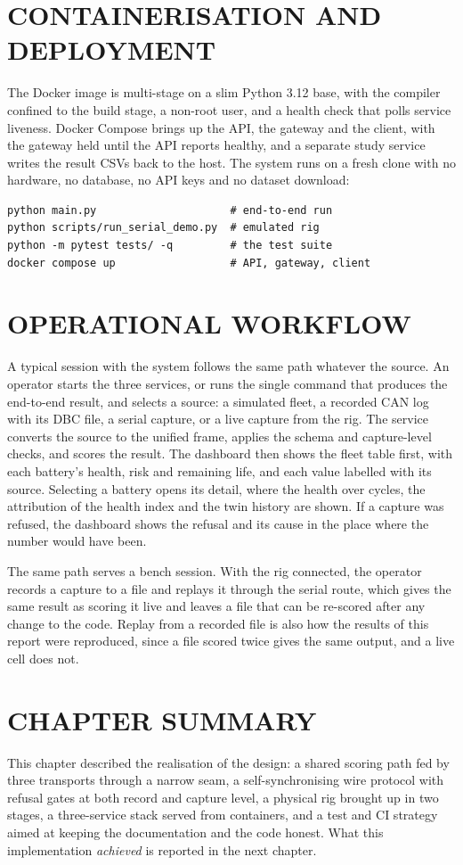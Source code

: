 \section{CONTAINERISATION AND DEPLOYMENT}
\label{sec:impl-deploy}

The Docker image is multi-stage on a slim Python 3.12 base, with the compiler confined to the build stage, a non-root user, and a health check that polls service liveness. Docker Compose brings up the API, the gateway and the client, with the gateway held until the API reports healthy, and a separate study service writes the result CSVs back to the host. The system runs on a fresh clone with no hardware, no database, no API keys and no dataset download:

\begin{verbatim}
python main.py                     # end-to-end run
python scripts/run_serial_demo.py  # emulated rig
python -m pytest tests/ -q         # the test suite
docker compose up                  # API, gateway, client
\end{verbatim}

\section{OPERATIONAL WORKFLOW}

A typical session with the system follows the same path whatever the source. An operator starts the three services, or runs the single command that produces the end-to-end result, and selects a source: a simulated fleet, a recorded CAN log with its DBC file, a serial capture, or a live capture from the rig. The service converts the source to the unified frame, applies the schema and capture-level checks, and scores the result. The dashboard then shows the fleet table first, with each battery's health, risk and remaining life, and each value labelled with its source. Selecting a battery opens its detail, where the health over cycles, the attribution of the health index and the twin history are shown. If a capture was refused, the dashboard shows the refusal and its cause in the place where the number would have been.

The same path serves a bench session. With the rig connected, the operator records a capture to a file and replays it through the serial route, which gives the same result as scoring it live and leaves a file that can be re-scored after any change to the code. Replay from a recorded file is also how the results of this report were reproduced, since a file scored twice gives the same output, and a live cell does not.

\section{CHAPTER SUMMARY}

This chapter described the realisation of the design: a shared scoring path fed by three transports through a narrow seam, a self-synchronising wire protocol with refusal gates at both record and capture level, a physical rig brought up in two stages, a three-service stack served from containers, and a test and CI strategy aimed at keeping the documentation and the code honest. What this implementation \emph{achieved} is reported in the next chapter.
